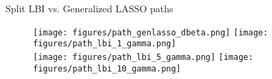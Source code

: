 \documentclass[slidestop,compress,9pt,epsfig,color]{beamer}
\theoremstyle{example}
\begin{document}

\begin{frame}{Split LBI vs. Generalized LASSO paths}
\begin{figure}
\centering
        \texttt{[image: figures/path\_genlasso\_dbeta.png]}
        \texttt{[image: figures/path\_lbi\_1\_gamma.png]} \\
        \texttt{[image: figures/path\_lbi\_5\_gamma.png]}
        \texttt{[image: figures/path\_lbi\_10\_gamma.png]}
\end{figure}
\end{frame}
\end{document}
